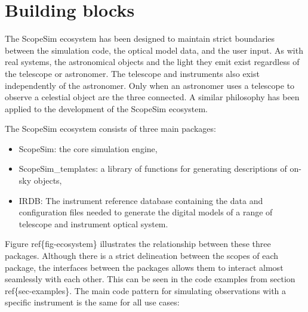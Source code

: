 

\section{Building blocks%
  \label{building-blocks}%
}

\begin{figure}[H]
\noindent{}\label{fig-ecosystem}
\end{figure}

The ScopeSim ecosystem has been designed to maintain strict boundaries between the simulation code, the optical model data, and the user input.
As with real systems, the astronomical objects and the light they emit exist regardless of the telescope or astronomer.
The telescope and instruments also exist independently of the astronomer.
Only when an astronomer uses a telescope to observe a celestial object are the three connected.
A similar philosophy has been applied to the development of the ScopeSim ecosystem.

The ScopeSim ecosystem consists of three main packages:

\begin{itemize}
\item ScopeSim: the core simulation engine,

\item ScopeSim\_templates: a library of functions for generating descriptions of on-sky objects,

\item IRDB: The instrument reference database containing the data and configuration files needed to generate the digital models of a range of telescope and instrument optical system.
\end{itemize}

Figure ref\{fig-ecosystem\} illustrates the relationship between these three packages.
Although there is a strict delineation between the scopes of each package, the interfaces between the packages allows them to interact almost seamlessly with each other.
This can be seen in the code examples from section ref\{sec-examples\}.
The main code pattern for simulating observations with a specific instrument is the same for all use cases:

